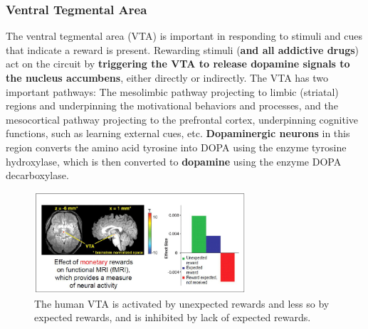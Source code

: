 \documentclass{book}
\begin{document}
\subsubsection{Ventral Tegmental Area}
The ventral tegmental area (VTA) is important in responding to stimuli and cues that indicate a reward is present. 
Rewarding stimuli (\textbf{and all addictive drugs}) act on the circuit by \textbf{triggering the VTA to release dopamine signals to the nucleus accumbens}, either directly or indirectly. 
The VTA has two important pathways: The mesolimbic pathway projecting to limbic (striatal) regions and underpinning the motivational behaviors and processes, and the mesocortical pathway projecting to the prefrontal cortex, underpinning cognitive functions, such as learning external cues, etc.
\textbf{Dopaminergic neurons} in this region converts the amino acid tyrosine into DOPA using the enzyme tyrosine hydroxylase, which is then converted to \textbf{dopamine} using the enzyme DOPA decarboxylase.
\begin{figure}
    \centering
    \includegraphics[width=0.7\textwidth]{images3/image9.png}
    \caption{\label{fig:VTA}The human VTA is activated by unexpected rewards and less so by expected rewards, and is inhibited by lack of expected rewards.}
\end{figure}
\end{document}
